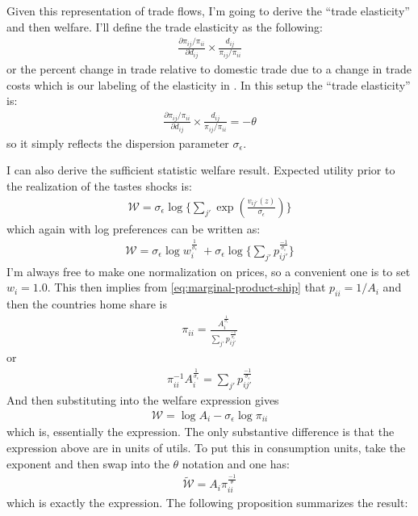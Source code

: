 \documentclass[12pt,pdftex]{article}
\begin{document}
\begin{onehalfspacing}
Given this representation of trade flows, I'm going to derive the ``trade elasticity'' and then welfare. I'll define the trade elasticity as the following:
\begin{align}
\frac{\partial \pi_{ij} / \pi_{ii}}{\partial d_{ij}} \times \frac{d_{ij}}{\pi_{ij} / \pi_{ii}}
\end{align}
or the percent change in trade relative to domestic trade due to a change in trade costs which is our labeling of the elasticity in \citet{simonovska2014elasticity}. In this setup the ``trade elasticity'' is:
\begin{align}
\frac{\partial \pi_{ij} / \pi_{ii}}{\partial d_{ij}} \times \frac{d_{ij}}{\pi_{ij} / \pi_{ii}} = -\theta 
\end{align}
so it simply reflects the dispersion parameter $\sigma_{\epsilon}$.

I can also derive the \citet{arkolakis2012new} sufficient statistic welfare result. Expected utility  prior to the realization of the tastes shocks is:
\begin{align}
\mathcal{W} = \sigma_{\epsilon} \log \bigg \{ \sum_{j'} \exp \left( \frac{ v_{ij'}(z) }{\sigma_{\epsilon}} \right) \bigg \}
\end{align}
which again with log preferences can be written as:
\begin{align}
\mathcal{W} = \sigma_{\epsilon} \log w_{i}^{\frac{1}{\sigma_{\epsilon}}} \ + \sigma_{\epsilon} \log \bigg \{ \sum_{j'} p_{ij'}^{\frac{-1}{\sigma_{\epsilon}}} \bigg \}
\end{align}
I'm always free to make one normalization on prices, so a convenient one is to set $w_i = 1.0$. This then implies from \ref{eq:marginal-product-ship} that $p_{ii} = 1 / A_{i}$ and then the countries home share is
\begin{align}
\pi_{ii} = \frac{A_i^{\frac{1}{\sigma_{\epsilon}}}}{\sum_{j'} p_{ij'}^{\frac{-1}{\sigma_{\epsilon}}}}
\end{align}
or
\begin{align}
\pi_{ii}^{-1}A_i^{\frac{1}{\sigma_{\epsilon}}} = \sum_{j'} p_{ij'}^{\frac{-1}{\sigma_{\epsilon}}}
\end{align}
And then substituting into the welfare expression gives
\begin{align}
\mathcal{W} = \log A_{i}  - \sigma_{\epsilon} \log \pi_{ii}
\end{align}
which is, essentially the \citet{arkolakis2012new} expression. The only substantive difference is that the expression above are in units of utils. To put this in consumption units, take the exponent and then swap into the $\theta$ notation and one has:
\begin{align}
\mathcal{\tilde W} = A_{i} \pi_{ii}^{\frac{-1}{\theta}}
\end{align}
which is exactly the \citet{arkolakis2012new} expression. The following proposition summarizes the result:


\end{onehalfspacing}
\end{document}
